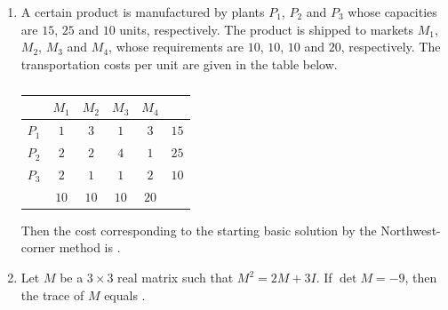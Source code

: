\documentclass[journal,12pt,onecolumn]{IEEEtran}
\theoremstyle{remark}
\begin{document}
\begin{enumerate}
\hfill{}

\item A certain product is manufactured by plants $P_1$, $P_2$ and $P_3$ whose capacities are $15$, $25$ and $10$ units, respectively. The product is shipped to markets $M_1$, $M_2$, $M_3$ and $M_4$, whose requirements are $10$, $10$, $10$ and $20$, respectively. The transportation costs per unit are given in the table below.
\begin{table}[H]
\centering
\caption*{}
\label{tab:ma2022-64-transport}
\begin{tabular}{c|c|c|c|c|c}
 & $M_1$ & $M_2$ & $M_3$ & $M_4$ &  \\
\hline
$P_1$ & $1$ & $3$ & $1$ & $3$ & $15$ \\ \hline
$P_2$ & $2$ & $2$ & $4$ & $1$ & $25$ \\ \hline
$P_3$ & $2$ & $1$ & $1$ & $2$ & $10$ \\
\hline
 & $10$ & $10$ & $10$ & $20$ & \\
\end{tabular}
\end{table}

Then the cost corresponding to the starting basic solution by the Northwest-corner method is \underline{\hspace{2cm}}.

\hfill{}

\item Let $M$ be a $3 \times 3$ real matrix such that $M^2 = 2M + 3I$. If $\det M = -9$, then the trace of $M$ equals \underline{\hspace{2cm}}.

\hfill{}

\end{enumerate}
\end{document}
